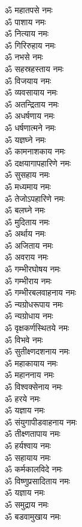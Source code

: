 \begin{multicols}{2}
\begin{flushleft}
ॐ महातपसे नमः\\
ॐ पाशाय नमः\\
ॐ नित्याय नमः\\
ॐ गिरिरुहाय नमः\\
ॐ नभसे नमः\\
ॐ सहस्रहस्ताय नमः\hfill{}\\
ॐ विजयाय नमः\\
ॐ व्यवसायाय नमः\\
ॐ अतन्द्रिताय नमः\\
ॐ अधर्षणाय नमः\\
ॐ धर्षणात्मने नमः\\
ॐ यज्ञघ्ने नमः\\
ॐ कामनाशकाय नमः\\
ॐ दक्षयागापहारिणे नमः\\
ॐ सुसहाय नमः\\
ॐ मध्यमाय नमः\hfill{}\\
ॐ तेजोऽपहारिणे नमः\\
ॐ बलघ्ने नमः\\
ॐ मुदिताय नमः\\
ॐ अर्थाय नमः\\
ॐ अजिताय नमः\\
ॐ अवराय नमः\\
ॐ गम्भीरघोषय नमः\\
ॐ गम्भीराय नमः\\
ॐ गम्भीरबलवाहनाय नमः\\
ॐ न्यग्रोधरूपाय नमः\hfill{}\\
ॐ न्यग्रोधाय नमः\\
ॐ वृक्षकर्णस्थितये नमः\\
ॐ विभवे नमः\\
ॐ सुतीक्ष्णदशनाय नमः\\
ॐ महाकायाय नमः\\
ॐ महाननाय नमः\\
ॐ विश्वक्सेनाय नमः\\
ॐ हरये नमः\\
ॐ यज्ञाय नमः\\
ॐ संयुगापीडवाहनाय नमः\hfill{}\\
ॐ तीक्ष्णतापाय नमः\\
ॐ हर्यश्वाय नमः\\
ॐ सहायाय नमः\\
ॐ कर्मकालविदे नमः\\
ॐ विष्णुप्रसादिताय नमः\\
ॐ यज्ञाय नमः\\
ॐ समुद्राय नमः\\
ॐ बडवामुखाय नमः\\

\end{flushleft}
\end{multicols}
